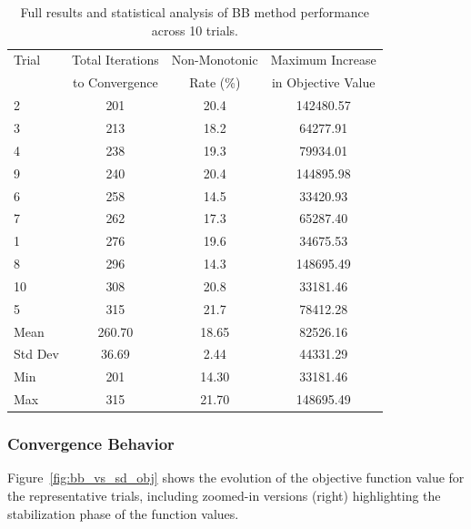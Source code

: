 \documentclass[12pt]{article}
\begin{document}
\begin{table}[H]
    \centering
    \begin{tabular}{lccc}
        \hline
        Trial & Total Iterations  & Non-Monotonic & Maximum Increase  \\
        & to Convergence & Rate (\%) & in Objective Value \\
        \hline
        2  & 201 & 20.4 & 142480.57 \\
        3  & 213 & 18.2 & 64277.91 \\
        4  & 238 & 19.3 & 79934.01 \\
        9  & 240 & 20.4 & 144895.98 \\
        6  & 258 & 14.5 & 33420.93 \\
        7  & 262 & 17.3 & 65287.40 \\
        1  & 276 & 19.6 & 34675.53 \\
        8  & 296 & 14.3 & 148695.49 \\
        10 & 308 & 20.8 & 33181.46 \\
        5  & 315 & 21.7 & 78412.28 \\
        \hline
        Mean & 260.70 & 18.65 & 82526.16 \\
        Std Dev & 36.69 & 2.44 & 44331.29 \\
        Min & 201 & 14.30 & 33181.46 \\
        Max & 315 & 21.70 & 148695.49 \\
        \hline
    \end{tabular}
    \caption{Full results and statistical analysis of BB method performance across 10 trials.}
    \label{tab:bb_stats}
\end{table}

\subsubsection{Convergence Behavior}

Figure~\ref{fig:bb_vs_sd_obj} shows the evolution of the objective function value for the representative trials, including zoomed-in versions (right) highlighting the stabilization phase of the function values. 
\end{document}
